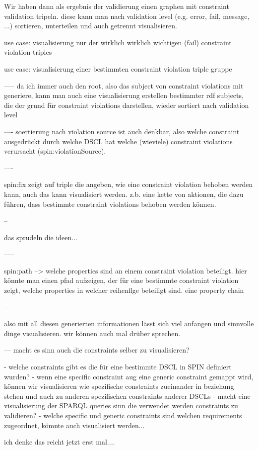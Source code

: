 \documentclass{llncs}
\begin{document}
Wir haben dann als ergebnis der validierung einen graphen mit constraint validation tripeln.
diese kann man nach validation level (e.g. error, fail, message, ...) sortieren, unterteilen und auch getrennt visualisieren.

use case:
visualisierung nur der wirklich wirklich wichtigen (fail) constraint violation triples

use case:
visualisierung einer bestimmten constraint violation triple gruppe

-----
da ich immer auch den root, also das subject von constraint violations mit generiere, kann man auch eine visualisierung erstellen bestimmter rdf subjects, die der grund für constraint violations darstellen, wieder sortiert nach validation level

----
soertierung nach violation source ist auch denkbar, also welche constraint ausgedrückt durch welche DSCL hat welche (wieviele) constraint violations verursacht (spin:violationSource).

----

spin:fix zeigt auf triple die angeben, wie eine constraint violation behoben werden kann, auch das kann visualisiert werden.
z.b. eine kette von aktionen, die dazu führen, dass bestimmte constraint violations behoben werden können.

--

das sprudeln die ideen...

-----

spin:path --> welche properties sind an einem constraint violation beteiligt. hier könnte man einen pfad aufzeigen, der für eine bestimmte constraint violation zeigt, welche properties in welcher reihenflge beteiligt sind. eine property chain

--

 also mit all diesen generierten informationen lässt sich viel anfangen und sinnvolle dinge visualisieren.
wir können auch mal drüber sprechen.

---
macht es sinn auch die constraints selber zu visualisieren?

- welche constraints gibt es die für eine bestimmte DSCL in SPIN definiert wurden?
- wenn eine specific constraint aug eine generic constraint gemappt wird, können wir visualisieren wie spezifische constraints zueinander in beziehung stehen und auch zu anderen spezifischen constraints anderer DSCLs
- macht eine visualisierung der SPARQL queries sinn die verwendet werden constraints zu validieren?
- welche specific und generic constraints sind welchen requirements zugeordnet, kömnte auch visualisiert werden...

ich denke das reicht jetzt erst mal....

{}

\setcounter{tocdepth}{1}
\end{document}
